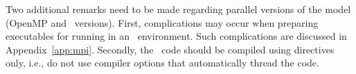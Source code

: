 \vspace{\baselineskip} 
\noindent 
Two additional remarks need to be made regarding parallel versions of the
model (OpenMP and \mpi\ versions). First, complications may occur when
preparing executables for running in an \mpi\ environment. Such complications
are discussed in Appendix~\ref{app:mpi}. Secondly, the \omp\ code should be
compiled using directives only, i.e., do not use compiler options that
automatically thread the code.
